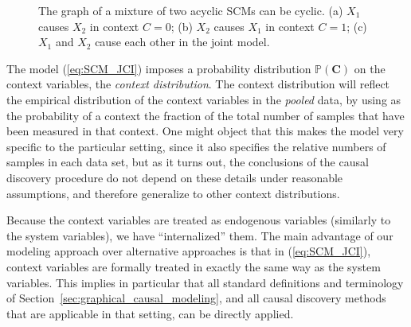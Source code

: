 \documentclass[twoside,11pt]{article}
\newcommand{\Prb}{\mathbb{P}}
\newcommand\B[1]{\bm{#1}}
\newcommand\eref[1]{(\ref{#1})}
\begin{document}
\begin{figure}\centering%
  \caption{The graph of a mixture of two acyclic SCMs can be cyclic. (a) $X_1$ causes $X_2$ in context $C=0$; (b) $X_2$ causes $X_1$ in context $C=1$; (c) $X_1$ and $X_2$ cause each other in the joint model.\label{fig:example_cyclic}}
\end{figure}

The model \eref{eq:SCM_JCI} imposes a probability distribution $\Prb(\B{C})$ on
the context variables, the \emph{context distribution}. The context distribution
will reflect the empirical distribution of the context variables
in the \emph{pooled} data, by using as the probability of a context the
fraction of the total number of samples that have been measured in that
context. One might object that this makes the model very specific to the
particular setting, since it also specifies the relative numbers of samples in
each data set, but as it turns out, the conclusions of the causal discovery 
procedure do not depend on these details under reasonable assumptions, and 
therefore generalize to other context distributions.

Because the context variables are treated as endogenous variables (similarly to the system variables),
we have ``internalized'' them. 
The main advantage of our modeling approach over alternative approaches is that in \eref{eq:SCM_JCI}, context variables
are formally treated in exactly the same way as the system variables.
This implies in particular that all standard definitions and terminology of Section~\ref{sec:graphical_causal_modeling}, and all
causal discovery methods that are applicable in that setting, can be directly applied.
\end{document}
